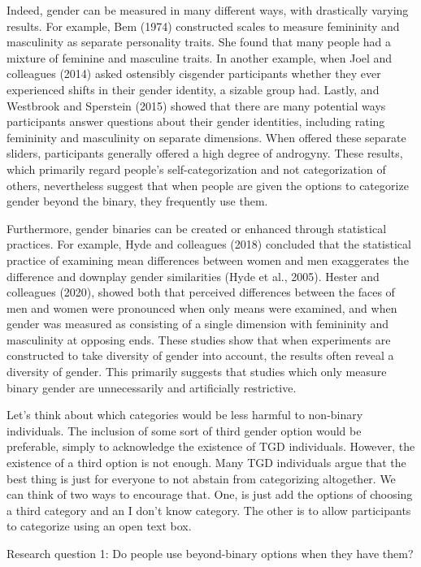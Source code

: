 \documentclass[
  man]{apa7}
\begin{document}
Indeed, gender can be measured in many different ways, with drastically varying results. For example, Bem (1974) constructed scales to measure femininity and masculinity as separate personality traits. She found that many people had a mixture of feminine and masculine traits. In another example, when Joel and colleagues (2014) asked ostensibly cisgender participants whether they ever experienced shifts in their gender identity, a sizable group had. Lastly, and Westbrook and Sperstein (2015) showed that there are many potential ways participants answer questions about their gender identities, including rating femininity and masculinity on separate dimensions. When offered these separate sliders, participants generally offered a high degree of androgyny. These results, which primarily regard people's self-categorization and not categorization of others, nevertheless suggest that when people are given the options to categorize gender beyond the binary, they frequently use them.

Furthermore, gender binaries can be created or enhanced through statistical practices. For example, Hyde and colleagues (2018) concluded that the statistical practice of examining mean differences between women and men exaggerates the difference and downplay gender similarities (Hyde et al., 2005). Hester and colleagues (2020), showed both that perceived differences between the faces of men and women were pronounced when only means were examined, and when gender was measured as consisting of a single dimension with femininity and masculinity at opposing ends. These studies show that when experiments are constructed to take diversity of gender into account, the results often reveal a diversity of gender. This primarily suggests that studies which only measure binary gender are unnecessarily and artificially restrictive.

Let's think about which categories would be less harmful to non-binary individuals. The inclusion of some sort of third gender option would be preferable, simply to acknowledge the existence of TGD individuals. However, the existence of a third option is not enough. Many TGD individuals argue that the best thing is just for everyone to not abstain from categorizing altogether. We can think of two ways to encourage that. One, is just add the options of choosing a third category and an I don't know category. The other is to allow participants to categorize using an open text box.

Research question 1: Do people use beyond-binary options when they have them?
\end{document}
